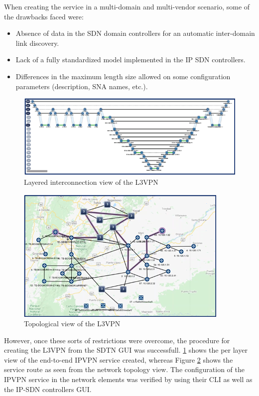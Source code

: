 \documentclass[a4paper,fleqn]{cas-dc}
\begin{document}
When creating the service in a multi-domain and multi-vendor scenario, some of the  drawbacks faced were: 
\begin{itemize}
    \item Absence of data in the SDN domain controllers for an automatic inter-domain link discovery.
    \item Lack of a fully standardized model implemented in the IP SDN controllers.
    \item Differences in the maximum length size allowed on some configuration parameters (description, SNA names, etc.).
\end{itemize}

\begin{figure}
	\centering
		\includegraphics[width=\linewidth]{figs/l3vpn_topo.png}
	\caption{Layered interconnection view of the L3VPN}
	\label{FIG:l3vpn_topo}
\end{figure}

\begin{figure}
	\centering
		\includegraphics[width=\linewidth]{figs/l3vpn_topo_2.png}
	\caption{Topological view of the L3VPN}
	\label{FIG:l3vpn_topo2}
\end{figure}

However, once these sorts of restrictions were overcome, the procedure for creating the L3VPN from the SDTN GUI was successfull. \ref{FIG:l3vpn_topo} shows the per layer view of the end-to-end IPVPN service created, whereas Figure \ref{FIG:l3vpn_topo2} shows the service route as seen from the network topology view. The configuration of the IPVPN service in the network elements was verified by using their CLI as well as the IP-SDN controllers GUI. 
\end{document}
